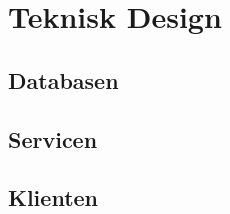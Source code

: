\chapter{Teknisk Design}
\label{Teknisk}



\section{Databasen}
\label{Teknisk_DB}

\section{Servicen}
\label{Teknisk_Service}

\section{Klienten}
\label{Teknisk_Client}